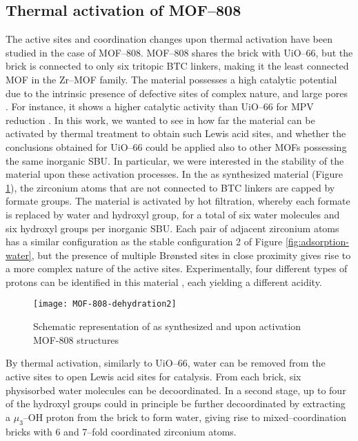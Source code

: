 \subsection*{Thermal activation of MOF--808}
The active sites and coordination changes upon thermal activation have been studied in the case of MOF--808.%
MOF--808 shares the  brick with UiO--66, but the brick is connected to only six tritopic BTC linkers, making it the least connected MOF in the Zr--MOF family. The material possesses a high catalytic potential due to the intrinsic presence of defective sites of complex nature, and large pores \cite{furukawa2014water}. For instance, it shows a higher catalytic activity than UiO--66 for MPV reduction \cite{plessers2016zr, mautschke2018catalytic}.
\npar
In this work, we wanted to see in how far the material can be activated by thermal treatment to obtain such Lewis acid sites, and whether the conclusions obtained for UiO--66 could be applied also to other MOFs possessing the same inorganic SBU. In particular, we were interested in the stability of the material upon these activation processes.
\npar
In the as synthesized material (Figure \ref{fig:MOF-808-dehydration2}), the zirconium atoms that are not connected to BTC linkers are capped by formate groups. The material is activated by hot filtration, whereby each formate is replaced by water and hydroxyl group, for a total of six water molecules and six hydroxyl groups per inorganic SBU\cite{plessers2016zr, mautschke2018catalytic}. Each pair of adjacent zirconium atoms has a similar configuration as the stable configuration 2 of Figure \ref{fig:adsorption-water}, but the presence of multiple Br\o{}nsted sites in close proximity gives rise to a more complex nature of the active sites. Experimentally, four different types of protons can be identified in this material \cite{klet2016evaluation}, each yielding a different acidity. 
\begin{figure}[!htbp]
	\centering
	\texttt{[image: MOF-808-dehydration2]}
	\caption{Schematic representation of as synthesized and upon activation MOF-808 structures}
	\label{fig:MOF-808-dehydration2}
\end{figure}
\npar
By thermal activation, similarly to UiO--66, water can be removed from the active sites to open Lewis acid sites for catalysis. From each brick, six physisorbed water molecules can be decoordinated. In a second stage, up to four of the hydroxyl groups could in principle be further decoordinated by extracting a $\mu_3$--OH proton from the brick to form water, giving rise to mixed--coordination bricks with 6 and 7--fold coordinated zirconium atoms.
